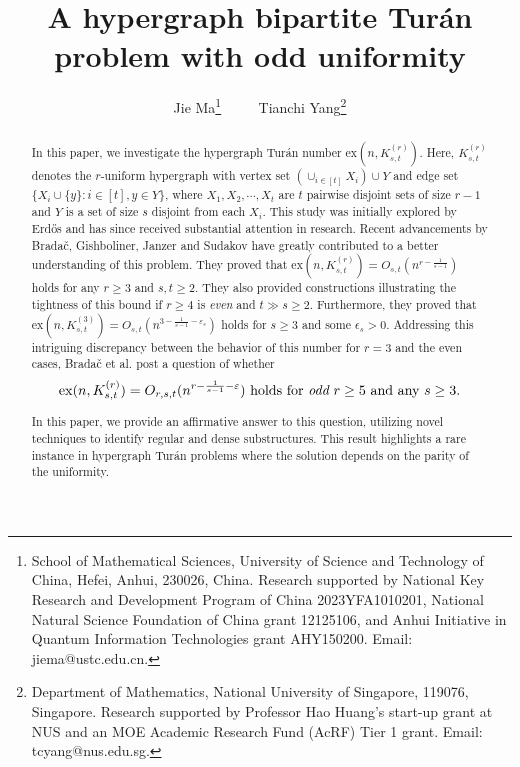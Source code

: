 \documentclass[11pt]{article}
\def\ex{\mathrm{ex}}
\begin{document}
\title{A hypergraph bipartite Tur\'an problem with odd uniformity}


\author{
Jie Ma\thanks{School of Mathematical Sciences, University of Science and Technology of China, Hefei, Anhui, 230026, China.
Research supported by National Key Research and Development Program of China 2023YFA1010201, National Natural Science Foundation of China grant 12125106, and Anhui Initiative in Quantum Information Technologies grant AHY150200. Email: jiema@ustc.edu.cn.}
~~~~
Tianchi Yang\thanks{Department of Mathematics, National University of Singapore, 119076, Singapore.
Research supported by Professor Hao Huang's start-up grant at NUS and an MOE Academic Research Fund (AcRF) Tier 1 grant. Email: tcyang@nus.edu.sg.
}
}

\date{}


\maketitle
\begin{abstract}
In this paper, we investigate the hypergraph Tur\'an number $\ex(n,K^{(r)}_{s,t})$.
Here, $K^{(r)}_{s,t}$ denotes the $r$-uniform hypergraph with vertex set $\left(\cup_{i\in [t]}X_i\right)\cup Y$ and edge set $\{X_i\cup \{y\}: i\in [t], y\in Y\}$, where $X_1,X_2,\cdots,X_t$ are $t$ pairwise disjoint sets of size $r-1$ and $Y$ is a set of size $s$ disjoint from each $X_i$.
This study was initially explored by Erd\H{o}s and has since received substantial attention in research.
Recent advancements by Brada\v{c}, Gishboliner, Janzer and Sudakov have greatly contributed to a better understanding of this problem.
They proved that $\ex(n,K_{s,t}^{(r)})=O_{s,t}(n^{r-\frac{1}{s-1}})$ holds for any $r\geq 3$ and $s,t\geq 2$.
They also provided constructions illustrating the tightness of this bound if $r\geq 4$ is {\it even} and $t\gg s\geq 2$.
Furthermore, they proved that $\ex(n,K_{s,t}^{(3)})=O_{s,t}(n^{3-\frac{1}{s-1}-\varepsilon_s})$ holds for $s\geq 3$ and some $\epsilon_s>0$.
Addressing this intriguing discrepancy between the behavior of this number for $r=3$ and the even cases,
Brada\v{c} et al. post a question of whether  
\begin{equation*}
\mbox{$\ex(n,K_{s,t}^{(r)})= O_{r,s,t}(n^{r-\frac{1}{s-1}- \varepsilon})$ holds for {\it odd} $r\geq 5$ and any $s\geq 3$.}
\end{equation*}

In this paper, we provide an affirmative answer to this question, utilizing novel techniques to identify regular and dense substructures.
This result highlights a rare instance in hypergraph Tur\'an problems where the solution depends on the parity of the uniformity.
\end{abstract}
\end{document}

